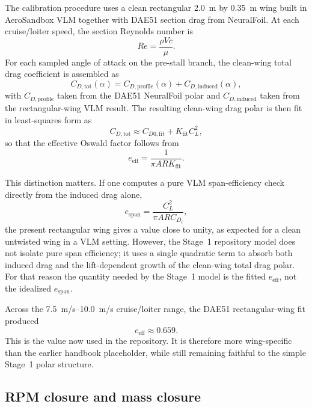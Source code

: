 \documentclass[conf]{new-aiaa}
\begin{document}
The calibration procedure uses a clean rectangular \SI{2.0}{m} by \SI{0.35}{m} wing built in AeroSandbox VLM together with DAE51 section drag from NeuralFoil. At each cruise/loiter speed, the section Reynolds number is
\begin{equation}
Re = \frac{\rho V c}{\mu}.
\end{equation}
For each sampled angle of attack on the pre-stall branch, the clean-wing total drag coefficient is assembled as
\begin{equation}
C_{D,\mathrm{tot}}(\alpha) =
C_{D,\mathrm{profile}}(\alpha) + C_{D,\mathrm{induced}}(\alpha),
\end{equation}
with \(C_{D,\mathrm{profile}}\) taken from the DAE51 NeuralFoil polar and \(C_{D,\mathrm{induced}}\) taken from the rectangular-wing VLM result. The resulting clean-wing drag polar is then fit in least-squares form as
\begin{equation}
C_{D,\mathrm{tot}} \approx C_{D0,\mathrm{fit}} + K_{\mathrm{fit}} C_L^2,
\end{equation}
so that the effective Oswald factor follows from
\begin{equation}
e_{\mathrm{eff}} = \frac{1}{\pi AR K_{\mathrm{fit}}}.
\end{equation}

This distinction matters. If one computes a pure VLM span-efficiency check directly from the induced drag alone,
\begin{equation}
e_{\mathrm{span}} = \frac{C_L^2}{\pi AR C_{D_i}},
\end{equation}
the present rectangular wing gives a value close to unity, as expected for a clean untwisted wing in a VLM setting. However, the Stage~1 repository model does not isolate pure span efficiency; it uses a single quadratic term to absorb both induced drag and the lift-dependent growth of the clean-wing total drag polar. For that reason the quantity needed by the Stage~1 model is the fitted \(e_{\mathrm{eff}}\), not the idealized \(e_{\mathrm{span}}\).

Across the \SIrange{7.5}{10.0}{m/s} cruise/loiter range, the DAE51 rectangular-wing fit produced
\begin{equation}
e_{\mathrm{eff}} \approx 0.659.
\end{equation}
This is the value now used in the repository. It is therefore more wing-specific than the earlier handbook placeholder, while still remaining faithful to the simple Stage~1 polar structure.

\subsection{RPM closure and mass closure}
\end{document}

